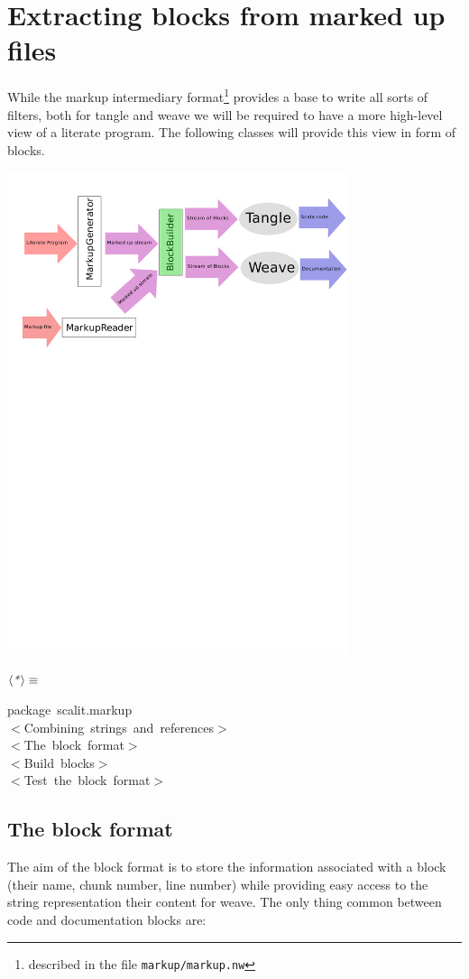 \documentclass[a4paper,12pt]{article}
\begin{document}
\section{Extracting blocks from marked up files}
While the markup intermediary format\footnote{described in the file
\texttt{markup/markup.nw}} provides a base to write all sorts of filters,
both for tangle and weave we will be required to have a more high-level
view of a literate program. The following classes will provide this
view in form of blocks.

\includegraphics[width=10cm,viewport=167 590 508 800,clip]{images/blockBuilder}

$\left<\mbox{\emph{*}}\right>\equiv$
\begin{program}{\vem package}~scalit.markup
\\[0.5em]$<$Combining~strings~and~references$>$
\\[0.5em]$<$The~block~format$>$
\\[0.5em]$<$Build~blocks$>$
\\[0.5em]$<$Test~the~block~format$>$
\\[0.5em]\end{program}


\subsection{The block format}
The aim of the block format is to store the information associated with a block
(their name, chunk number, line number) while providing easy access to the
string representation their content for weave. The only thing common between
code and documentation blocks are:
\end{document}
